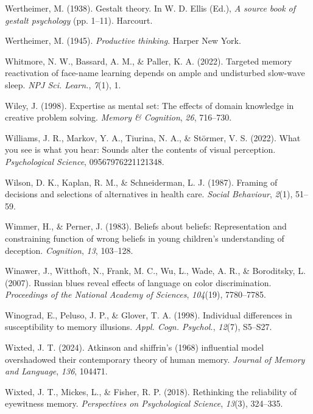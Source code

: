 \documentclass[
]{krantz}
\newlength{\cslhangindent}
\newenvironment{CSLReferences}[2] %
 {\begin{list}{}{%
  \setlength{\itemindent}{0pt}
  \setlength{\leftmargin}{0pt}
  \setlength{\parsep}{0pt}
  \ifodd #1
   \setlength{\leftmargin}{\cslhangindent}
   \setlength{\itemindent}{-1\cslhangindent}
  \fi
  \setlength{\itemsep}{#2\baselineskip}}}
 {\end{list}}
\begin{document}
\begin{CSLReferences}{1}{0}
Wertheimer, M. (1938). Gestalt theory. In W. D. Ellis (Ed.), \emph{A source book of gestalt psychology} (pp. 1--11). Harcourt.

Wertheimer, M. (1945). \emph{Productive thinking}. Harper New York.

Whitmore, N. W., Bassard, A. M., \& Paller, K. A. (2022). Targeted memory reactivation of face-name learning depends on ample and undisturbed slow-wave sleep. \emph{NPJ Sci. Learn.}, \emph{7}(1), 1.

Wiley, J. (1998). Expertise as mental set: The effects of domain knowledge in creative problem solving. \emph{Memory \& Cognition}, \emph{26}, 716--730.

Williams, J. R., Markov, Y. A., Tiurina, N. A., \& Störmer, V. S. (2022). What you see is what you hear: Sounds alter the contents of visual perception. \emph{Psychological Science}, 09567976221121348.

Wilson, D. K., Kaplan, R. M., \& Schneiderman, L. J. (1987). Framing of decisions and selections of alternatives in health care. \emph{Social Behaviour}, \emph{2}(1), 51--59.

Wimmer, H., \& Perner, J. (1983). Beliefs about beliefs: Representation and constraining function of wrong beliefs in young children's understanding of deception. \emph{Cognition}, \emph{13}, 103--128.

Winawer, J., Witthoft, N., Frank, M. C., Wu, L., Wade, A. R., \& Boroditsky, L. (2007). Russian blues reveal effects of language on color discrimination. \emph{Proceedings of the National Academy of Sciences}, \emph{104}(19), 7780--7785.

Winograd, E., Peluso, J. P., \& Glover, T. A. (1998). Individual differences in susceptibility to memory illusions. \emph{Appl. Cogn. Psychol.}, \emph{12}(7), S5--S27.

Wixted, J. T. (2024). Atkinson and shiffrin's (1968) influential model overshadowed their contemporary theory of human memory. \emph{Journal of Memory and Language}, \emph{136}, 104471.

Wixted, J. T., Mickes, L., \& Fisher, R. P. (2018). Rethinking the reliability of eyewitness memory. \emph{Perspectives on Psychological Science}, \emph{13}(3), 324--335.


\end{CSLReferences}
\end{document}
